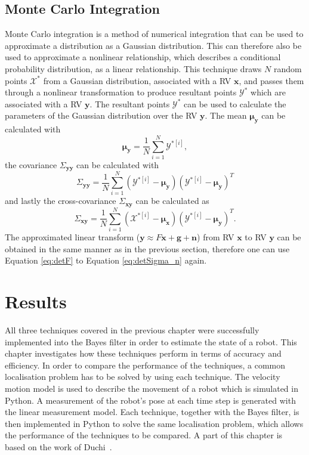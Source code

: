 \documentclass[12pt,oneside,openany,a4paper, %
afrikaans,english,
]{memoir}
\numberwithin{equation}{chapter}
\begin{document}
{\section{Monte Carlo Integration}
Monte Carlo integration is a method of numerical integration that can be used to approximate a distribution as a Gaussian distribution. This can therefore also be used to approximate a nonlinear relationship, which describes a conditional probability distribution, as a linear relationship. This technique draws $N$ random points $\mathcal{X}^*$ from a Gaussian distribution, associated with a RV $\bm{x}$, and passes them through a nonlinear transformation to produce resultant points $\mathcal{Y}^*$ which are associated with a RV $\bm{y}$. The resultant points $\mathcal{Y}^*$ can be used to calculate the parameters of the Gaussian distribution over the RV $\bm{y}$. The mean $\bm{\mu_y}$ can be calculated with
\begin{equation}
\bm{\mu_y} =  \frac{1}{N}\sum_{i=1}^N\mathcal{Y}^{*[i]},
\end{equation}
the covariance $\Sigma_{\bm{yy}}$ can be calculated with
\begin{equation}
\Sigma_{\bm{yy}} = \frac{1}{N}\sum_{i=1}^N (\mathcal{Y}^{*[i]} - \bm{\mu_y})(\mathcal{Y}^{*[i]} - \bm{\mu_y})^T
\end{equation}
and lastly the cross-covariance $\Sigma_{\bm{xy}}$ can be calculated as
\begin{equation}
\Sigma_{\bm{xy}} = \frac{1}{N}\sum_{i=1}^N (\mathcal{X}^{*[i]} - \bm{\mu_x})(\mathcal{Y}^{*[i]} - \bm{\mu_y})^T.
\end{equation}
The approximated linear transform ($\bm{y} \approx F\bm{x} + \bm{g} + \bm{n}$) from RV $\bm{x}$ to RV $\bm{y}$ can be obtained in the same manner as in the previous section, therefore one can use Equation \ref{eq:detF} to Equation \ref{eq:detSigma_n} again.

\chapter{Results}
All three techniques covered in the previous chapter were successfully implemented into the Bayes filter in order to estimate the state of a robot. This chapter investigates how these techniques perform in terms of accuracy and efficiency. In order to compare the performance of the techniques, a common localisation problem has to be solved by using each technique. The velocity motion model is used to describe the movement of a robot which is simulated in Python. A measurement of the robot's pose at each time step is generated with the linear measurement model. Each technique, together with the Bayes filter, is then implemented in Python to solve the same localisation problem, which allows the performance of the techniques to be compared. A part of this chapter is based on the work of Duchi~\cite{duchi}.

}
\end{document}
